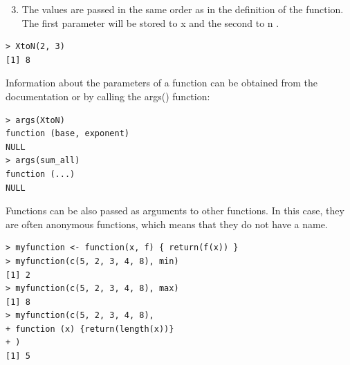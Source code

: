 \documentclass[11pt,openany,executivepaper]{book}
\begin{document}
\begin{enumerate}
  \setcounter{enumi}{2}
  \item The values are passed in the same order as in the definition of the function. The first parameter will be stored to x and the second to n .
\end{enumerate}

\begin{verbatim}
> XtoN(2, 3)
[1] 8
\end{verbatim}

Information about the parameters of a function can be obtained from the documentation or by calling the args() function:

\begin{verbatim}
> args(XtoN)
function (base, exponent)
NULL
> args(sum_all)
function (...)
NULL
\end{verbatim}

Functions can be also passed as arguments to other functions. In this case, they are often anonymous functions, which means that they do not have a name.

\begin{verbatim}
> myfunction <- function(x, f) { return(f(x)) }
> myfunction(c(5, 2, 3, 4, 8), min)
[1] 2
> myfunction(c(5, 2, 3, 4, 8), max)
[1] 8
> myfunction(c(5, 2, 3, 4, 8),
+ function (x) {return(length(x))}
+ )
[1] 5
\end{verbatim}
\end{document}
